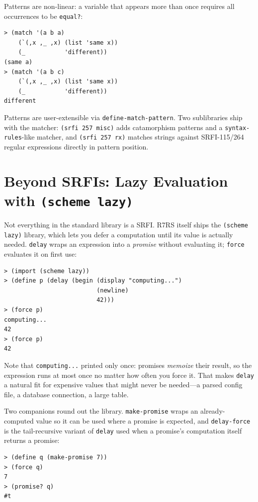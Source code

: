 Patterns are non-linear: a variable that appears more than once requires all occurrences to be \texttt{equal?}:

\begin{lstlisting}[style=repl]
> (match '(a b a)
    (`(,x ,_ ,x) (list 'same x))
    (_           'different))
(same a)
> (match '(a b c)
    (`(,x ,_ ,x) (list 'same x))
    (_           'different))
different
\end{lstlisting}

Patterns are user-extensible via \texttt{define-match-pattern}. Two sublibraries ship with the matcher: \texttt{(srfi 257 misc)} adds catamorphism patterns and a \texttt{syntax-rules}-like matcher, and \texttt{(srfi 257 rx)} matches strings against SRFI-115/264 regular expressions directly in pattern position.

\section{Beyond SRFIs: Lazy Evaluation with \texttt{(scheme lazy)}}

Not everything in the standard library is a SRFI. R7RS itself ships the \texttt{(scheme lazy)} library, which lets you defer a computation until its value is actually needed. \texttt{delay} wraps an expression into a \emph{promise} without evaluating it; \texttt{force} evaluates it on first use:

\begin{lstlisting}[style=repl]
> (import (scheme lazy))
> (define p (delay (begin (display "computing...")
                          (newline)
                          42)))
> (force p)
computing...
42
> (force p)
42
\end{lstlisting}

Note that \texttt{computing...} printed only once: promises \emph{memoize} their result, so the expression runs at most once no matter how often you force it. That makes \texttt{delay} a natural fit for expensive values that might never be needed---a parsed config file, a database connection, a large table.

Two companions round out the library. \texttt{make-promise} wraps an already-computed value so it can be used where a promise is expected, and \texttt{delay-force} is the tail-recursive variant of \texttt{delay} used when a promise's computation itself returns a promise:

\begin{lstlisting}[style=repl]
> (define q (make-promise 7))
> (force q)
7
> (promise? q)
#t
\end{lstlisting}

